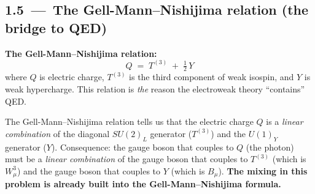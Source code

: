 \documentclass[11pt]{article}
\begin{document}
\subsection*{1.5 \,---\, The Gell-Mann--Nishijima relation (the bridge to QED)}

\begin{resultbox}
\textbf{The Gell-Mann--Nishijima relation:}
\[
\boxed{\;\;
Q \;=\; T^{(3)} \;+\; \tfrac{1}{2}\, Y
\;\;}
\]
where $Q$ is electric charge, $T^{(3)}$ is the third component of weak isospin, and $Y$ is
weak hypercharge. This relation is \emph{the} reason the electroweak theory ``contains'' QED.
\end{resultbox}

\begin{insightbox}
The Gell-Mann--Nishijima relation tells us that the electric charge $Q$ is a \emph{linear
combination} of the diagonal $SU(2)_L$ generator ($T^{(3)}$) and the $U(1)_Y$ generator ($Y$).
Consequence: the gauge boson that couples to $Q$ (the photon) must be a \emph{linear
combination} of the gauge boson that couples to $T^{(3)}$ (which is $W^3_\mu$) and the
gauge boson that couples to $Y$ (which is $B_\mu$). \textbf{The mixing in this problem is
already built into the Gell-Mann--Nishijima formula.}
\end{insightbox}
\end{document}
